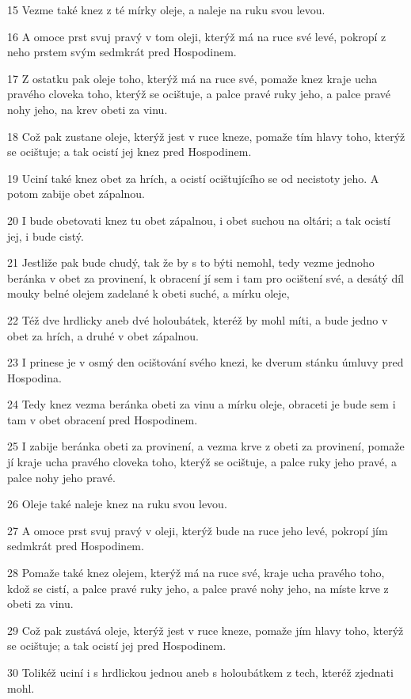 \par 15 Vezme také knez z té mírky oleje, a naleje na ruku svou levou.
\par 16 A omoce prst svuj pravý v tom oleji, kterýž má na ruce své levé, pokropí z neho prstem svým sedmkrát pred Hospodinem.
\par 17 Z ostatku pak oleje toho, kterýž má na ruce své, pomaže knez kraje ucha pravého cloveka toho, kterýž se ocištuje, a palce pravé ruky jeho, a palce pravé nohy jeho, na krev obeti za vinu.
\par 18 Což pak zustane oleje, kterýž jest v ruce kneze, pomaže tím hlavy toho, kterýž se ocištuje; a tak ocistí jej knez pred Hospodinem.
\par 19 Uciní také knez obet za hrích, a ocistí ocištujícího se od necistoty jeho. A potom zabije obet zápalnou.
\par 20 I bude obetovati knez tu obet zápalnou, i obet suchou na oltári; a tak ocistí jej, i bude cistý.
\par 21 Jestliže pak bude chudý, tak že by s to býti nemohl, tedy vezme jednoho beránka v obet za provinení, k obracení jí sem i tam pro ocištení své, a desátý díl mouky belné olejem zadelané k obeti suché, a mírku oleje,
\par 22 Též dve hrdlicky aneb dvé holoubátek, kteréž by mohl míti, a bude jedno v obet za hrích, a druhé v obet zápalnou.
\par 23 I prinese je v osmý den ocištování svého knezi, ke dverum stánku úmluvy pred Hospodina.
\par 24 Tedy knez vezma beránka obeti za vinu a mírku oleje, obraceti je bude sem i tam v obet obracení pred Hospodinem.
\par 25 I zabije beránka obeti za provinení, a vezma krve z obeti za provinení, pomaže jí kraje ucha pravého cloveka toho, kterýž se ocištuje, a palce ruky jeho pravé, a palce nohy jeho pravé.
\par 26 Oleje také naleje knez na ruku svou levou.
\par 27 A omoce prst svuj pravý v oleji, kterýž bude na ruce jeho levé, pokropí jím sedmkrát pred Hospodinem.
\par 28 Pomaže také knez olejem, kterýž má na ruce své, kraje ucha pravého toho, kdož se cistí, a palce pravé ruky jeho, a palce pravé nohy jeho, na míste krve z obeti za vinu.
\par 29 Což pak zustává oleje, kterýž jest v ruce kneze, pomaže jím hlavy toho, kterýž se ocištuje; a tak ocistí jej pred Hospodinem.
\par 30 Tolikéž uciní i s hrdlickou jednou aneb s holoubátkem z tech, kteréž zjednati mohl.
